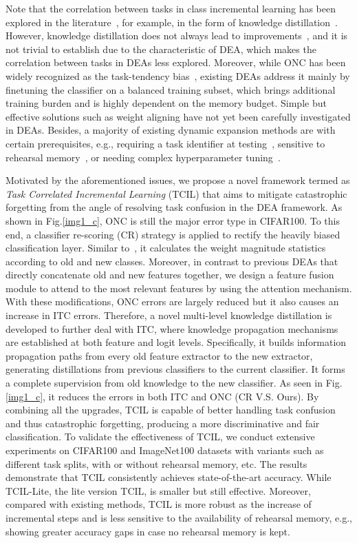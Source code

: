 \documentclass[letterpaper]{article} %
\begin{document}
Note that the correlation between tasks in class incremental learning has been explored in the literature~\cite{v0, t69, t32}, for example, in the form of knowledge distillation~\cite{w20, t54, t19, min2020multi}. However, knowledge distillation does not always lead to improvements~\cite{v0, v25}, and it is not trivial to establish due to the characteristic of DEA, which makes the correlation between tasks in DEAs less explored. Moreover, while ONC has been widely recognized as the task-tendency bias~\cite{v25, t69, d39}, existing DEAs address it mainly by finetuning the classifier on a balanced training subset, which brings additional training burden and is highly dependent on the memory budget. Simple but effective solutions such as weight aligning \cite{d39} have not yet been carefully investigated in DEAs. Besides, a majority of existing dynamic expansion methods are with certain prerequisites, e.g., requiring a task identifier at testing~\cite{t23, t33, t67}, sensitive to rehearsal memory~\cite{t70}, or needing complex hyperparameter tuning~\cite{t70}.


Motivated by the aforementioned issues, we propose a novel framework termed as \emph{Task Correlated Incremental Learning} (TCIL) that aims to mitigate catastrophic forgetting from the angle of resolving task confusion in the DEA framework. As shown in Fig.\ref{img1_c}, ONC is still the major error type in CIFAR100. To this end, a classifier re-scoring (CR) strategy is applied to rectify the heavily biased classification layer. Similar to~\cite{d39}, it calculates the weight magnitude statistics according to old and new classes. Moreover, in contrast to previous DEAs that directly concatenate old and new features together, we design a feature fusion module to attend to the most relevant features by using the attention mechanism. With these modifications, ONC errors are largely reduced but it also causes an increase in ITC errors. Therefore, a novel multi-level knowledge distillation is developed to further deal with ITC, where knowledge propagation mechanisms are established at both feature and logit levels. Specifically, it builds information propagation paths from every old feature extractor to the new extractor, generating distillations from previous classifiers to the current classifier. It forms a complete supervision from old knowledge to the new classifier. As seen in Fig.\ref{img1_c}, it reduces the errors in both ITC and ONC (CR V.S. Ours). By combining all the upgrades, TCIL is capable of better handling task confusion and thus catastrophic forgetting, producing a more discriminative and fair classification. To validate the effectiveness of TCIL, we conduct extensive experiments on CIFAR100 and ImageNet100 datasets with variants such as different task splits, with or without rehearsal memory, etc. The results demonstrate that TCIL consistently achieves state-of-the-art accuracy. While TCIL-Lite, the lite version TCIL, is smaller but still effective. Moreover, compared with existing methods, TCIL is more robust as the increase of incremental steps and is less sensitive to the availability of rehearsal memory, e.g., showing greater accuracy gaps in case no rehearsal memory is kept.
\end{document}
